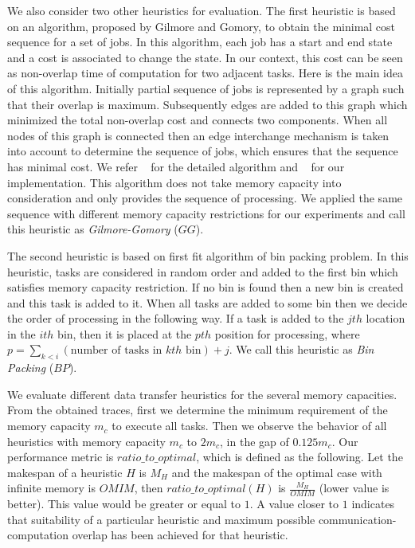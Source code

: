 \documentclass[sigconf]{acmart}
\begin{document}
{	%
	We also consider two other heuristics for evaluation. The first heuristic is based on an algorithm, proposed by Gilmore and Gomory, to obtain the minimal cost sequence for a set of jobs. In this algorithm, each job has a start and end state and a cost is associated to change the state. In our context, this cost can be seen as non-overlap time of computation for two adjacent tasks. Here is the main idea of this algorithm. Initially partial sequence of jobs is represented by a graph such that their overlap is maximum. Subsequently edges are added to this graph which minimized the total non-overlap cost  and connects two components. When all nodes of this graph is connected then an edge interchange mechanism is taken into account to determine the sequence of jobs, which ensures that the sequence has minimal cost. We refer ~\cite{Gilmore-Gomory:1964} for the detailed algorithm and ~\cite{gitworkrepo} for our implementation. This algorithm does not take memory capacity into consideration and only provides the sequence of processing. We applied the same sequence with different memory capacity restrictions for our experiments and call this heuristic as \textit{Gilmore-Gomory} ($GG$).
	
	The second heuristic is based on first fit algorithm of bin packing problem. In this heuristic, tasks are considered in random order and added to the first bin which satisfies memory capacity restriction. If no bin is found then a new bin is created and this task is added to it.  When all tasks are added to some bin then we decide the order of processing in the following way. If a task is added to the $jth$ location in the $ith$ bin, then it is placed at the $pth$ position for processing, where $p=\sum_{k<i}(\text{number of tasks in $kth$ bin}) + j$. We call this heuristic as \textit{Bin Packing} ($BP$). 
	
	
	
	We evaluate different data transfer heuristics for the several memory capacities. From the obtained traces, first we determine the minimum requirement of the memory capacity $m_c$ to execute all tasks. Then we observe the behavior of all heuristics with memory capacity  $m_c$ to $2m_c$, in the gap of $0.125m_c$. Our performance metric is $ratio\_to\_optimal$, which is defined as the following. Let the makespan of a heuristic $H$ is $M_H$ and the makespan of the optimal  case with infinite memory is $OMIM$, then  $ratio\_to\_optimal (H)$ is $\frac{M_H}{OMIM}$ (lower value is better). This value would be  greater or equal to $1$. A value closer to $1$ indicates that suitability of a particular heuristic and maximum possible communication-computation overlap has been achieved for that heuristic.
	
}
\end{document}
